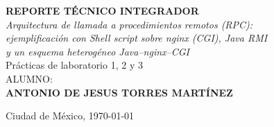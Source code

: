 \begin{titlepage}
    {\Large \textbf{REPORTE TÉCNICO INTEGRADOR}}\\[0.6cm]

    {\large \textit{Arquitectura de llamada a procedimientos remotos (RPC):\\
    ejemplificación con Shell script sobre nginx (CGI), Java RMI\\
    y un esquema heterogéneo Java--nginx--CGI}}\\[1cm]

    \large Prácticas de laboratorio 1, 2 y 3\\[1.5cm]

    \large ALUMNO:\\[0.3cm]
    \textbf{ANTONIO DE JESUS TORRES MARTÍNEZ}\\[1.5cm]

    \vfill

    \normalsize Ciudad de México, \today

\end{titlepage}
